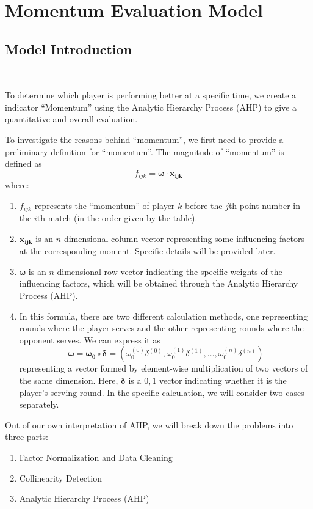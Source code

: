 \section{Momentum Evaluation Model}

\subsection{Model Introduction}~{}

To determine which player is performing better at a specific time, we create a indicator ``Momentum'' 
using the Analytic Hierarchy Process (AHP) to give a quantitative and overall evaluation.

\indent To investigate the reasons behind ``momentum'', we first need to provide a preliminary definition for ``momentum''. The magnitude of ``momentum'' is defined as $$f_{ijk}=\boldsymbol{\omega}\cdot\boldsymbol{x_{ijk}}$$
where:
\begin{enumerate}
    \item $f_{ijk}$ represents the ``momentum'' of player $k$ before the $j$th point number in the $i$th match (in the order given by the table).
    \item $\boldsymbol{x_{ijk}}$ is an $n$-dimensional column vector representing some influencing factors at the corresponding moment. Specific details will be provided later.
    \item $\boldsymbol{\omega}$ is an $n$-dimensional row vector indicating the specific weights of the influencing factors, which will be obtained through the Analytic Hierarchy Process (AHP).
    \item In this formula, there are two different calculation methods, one representing rounds where the player serves and the other representing rounds where the opponent serves. We can express it as $$\boldsymbol{\omega}=\boldsymbol{\omega_0} \circ \boldsymbol{\delta}=(\omega_0^{(0)}\delta^{(0)},\omega_0^{(1)}\delta^{(1)},\dots,\omega_0^{(n)}\delta^{(n)})$$ representing a vector formed by element-wise multiplication of two vectors of the same dimension. Here, $\boldsymbol{\delta}$ is a $0,1$ vector indicating whether it is the player's serving round. In the specific calculation, we will consider two cases separately.
\end{enumerate}

Out of our own interpretation of AHP, we will break down the problems into three parts:

\begin{enumerate}
    \item Factor Normalization and Data Cleaning
    \item Collinearity Detection
    \item Analytic Hierarchy Process (AHP)
\end{enumerate}


